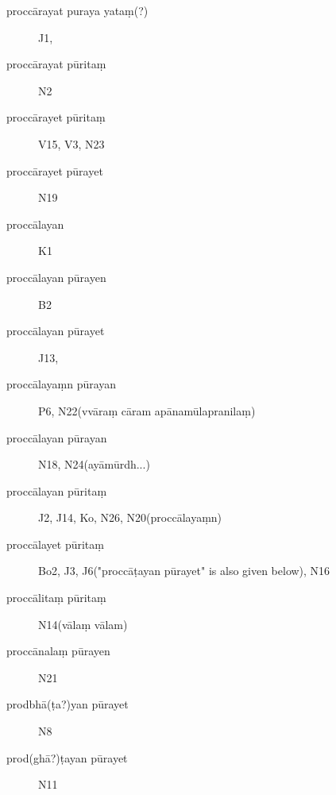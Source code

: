 \begin{ekdosis}
\begin{marma}[hp01_048]
\begin{description}
  \item[proccārayat puraya yataṃ(?)]        J1,
  \item[proccārayat pūritaṃ]        N2
  \item[proccārayet pūritaṃ]        V15, V3, N23
  \item[proccārayet pūrayet]        N19
  \item[proccālayan]        K1
  \item[proccālayan pūrayen]        B2
  \item[proccālayan pūrayet]        J13,
  \item[proccālayaṃn pūrayan]        P6, N22(vvāraṃ cāram apānamūlapranilaṃ)
  \item[proccālayan pūrayan]        N18, N24(ayāmūrdh...)
  \item[proccālayan pūritaṃ]        J2, J14, Ko, N26, N20(proccālayaṃn)
  \item[proccālayet pūritaṃ]        Bo2, J3, J6("proccāṭayan pūrayet" is also given below), N16
  \item[proccālitaṃ pūritaṃ]        N14(vālaṃ vālam)
  \item[proccānalaṃ pūrayen]        N21
  \item[prodbhā(ṭa?)yan pūrayet]        N8
  \item[prod(ghā?)ṭayan pūrayet]        N11



\end{description}
\end{marma}
\end{ekdosis}
